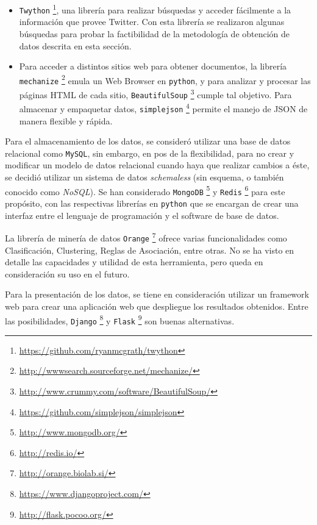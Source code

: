 \documentclass[11pt,letterpaper]{article}
\begin{document}
\begin{itemize}
\item \texttt{Twython} \footnote{\href{https://github.com/ryanmcgrath/twython}{https://github.com/ryanmcgrath/twython} }, una
     librería para realizar búsquedas y acceder fácilmente a la
     información que provee Twitter. Con esta librería se realizaron
     algunas búsquedas para probar la factibilidad de la metodología
     de obtención de datos descrita en esta sección.
\item Para acceder a distintos sitios web para obtener documentos, la
     librería \texttt{mechanize}
     \footnote{\href{http://wwwsearch.sourceforge.net/mechanize/}{http://wwwsearch.sourceforge.net/mechanize/} } emula un Web
     Browser en \texttt{python}, y para analizar y procesar las páginas HTML
     de cada sitio, \texttt{BeautifulSoup}
     \footnote{\href{http://www.crummy.com/software/BeautifulSoup/}{http://www.crummy.com/software/BeautifulSoup/} } cumple tal
     objetivo. Para almacenar y empaquetar datos, \texttt{simplejson}
     \footnote{\href{https://github.com/simplejson/simplejson}{https://github.com/simplejson/simplejson} } permite el manejo
     de JSON de manera flexible y rápida.
\end{itemize}
   Para el almacenamiento de los datos, se consideró utilizar una base
   de datos relacional como \texttt{MySQL}, sin embargo, en pos de la
   flexibilidad, para no crear y modificar un modelo de datos
   relacional cuando haya que realizar cambios a éste, se decidió
   utilizar un sistema de datos \emph{schemaless} (sin esquema, o también
   conocido como \emph{NoSQL}). Se han considerado \texttt{MongoDB}
   \footnote{\href{http://www.mongodb.org/}{http://www.mongodb.org/} } y \texttt{Redis} \footnote{\href{http://redis.io/}{http://redis.io/} } para
   este propósito, con las respectivas librerías en \texttt{python} que se
   encargan de crear una interfaz entre el lenguaje de programación y
   el software de base de datos.

   La librería de minería de datos \texttt{Orange}
   \footnote{\href{http://orange.biolab.si/}{http://orange.biolab.si/} } ofrece varias funcionalidades como
   Clasificación, Clustering, Reglas de Asociación, entre otras. No se
   ha visto en detalle las capacidades y utilidad de esta herramienta,
   pero queda en consideración su uso en el futuro.

   Para la presentación de los datos, se tiene en consideración
   utilizar un framework web para crear una aplicación web que
   despliegue los resultados obtenidos. Entre las posibilidades,
   \texttt{Django} \footnote{\href{https://www.djangoproject.com/}{https://www.djangoproject.com/} } y \texttt{Flask}
   \footnote{\href{http://flask.pocoo.org/}{http://flask.pocoo.org/} } son buenas alternativas.
\end{document}
